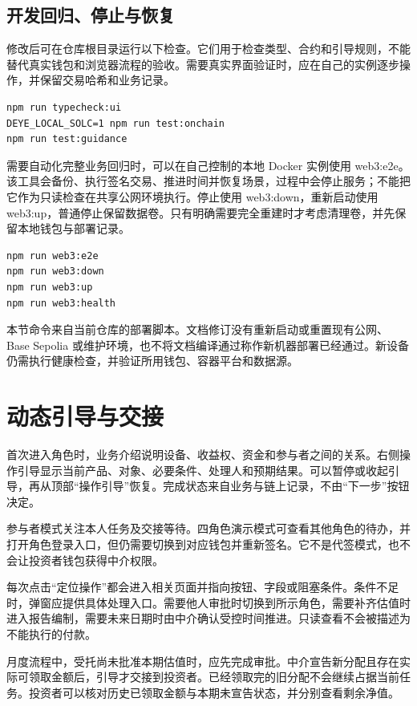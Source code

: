 \documentclass[12pt,a4paper]{article}
\begin{document}
\subsection{开发回归、停止与恢复}
修改后可在仓库根目录运行以下检查。它们用于检查类型、合约和引导规则，不能替代真实钱包和浏览器流程的验收。需要真实界面验证时，应在自己的实例逐步操作，并保留交易哈希和业务记录。

\begin{verbatim}
npm run typecheck:ui
DEYE_LOCAL_SOLC=1 npm run test:onchain
npm run test:guidance
\end{verbatim}
需要自动化完整业务回归时，可以在自己控制的本地 Docker 实例使用 web3:e2e。该工具会备份、执行签名交易、推进时间并恢复场景，过程中会停止服务；不能把它作为只读检查在共享公网环境执行。停止使用 web3:down，重新启动使用 web3:up，普通停止保留数据卷。只有明确需要完全重建时才考虑清理卷，并先保留本地钱包与部署记录。

\begin{verbatim}
npm run web3:e2e
npm run web3:down
npm run web3:up
npm run web3:health
\end{verbatim}
本节命令来自当前仓库的部署脚本。文档修订没有重新启动或重置现有公网、Base Sepolia 或维护环境，也不将文档编译通过称作新机器部署已经通过。新设备仍需执行健康检查，并验证所用钱包、容器平台和数据源。

\clearpage\section{动态引导与交接}
首次进入角色时，业务介绍说明设备、收益权、资金和参与者之间的关系。右侧操作引导显示当前产品、对象、必要条件、处理人和预期结果。可以暂停或收起引导，再从顶部“操作引导”恢复。完成状态来自业务与链上记录，不由“下一步”按钮决定。

参与者模式关注本人任务及交接等待。四角色演示模式可查看其他角色的待办，并打开角色登录入口，但仍需要切换到对应钱包并重新签名。它不是代签模式，也不会让投资者钱包获得中介权限。

每次点击“定位操作”都会进入相关页面并指向按钮、字段或阻塞条件。条件不足时，弹窗应提供具体处理入口。需要他人审批时切换到所示角色，需要补齐估值时进入报告编制，需要未来日期时由中介确认受控时间推进。只读查看不会被描述为不能执行的付款。

月度流程中，受托尚未批准本期估值时，应先完成审批。中介宣告新分配且存在实际可领取金额后，引导才交接到投资者。已经领取完的旧分配不会继续占据当前任务。投资者可以核对历史已领取金额与本期未宣告状态，并分别查看剩余净值。

\clearpage
\end{document}
